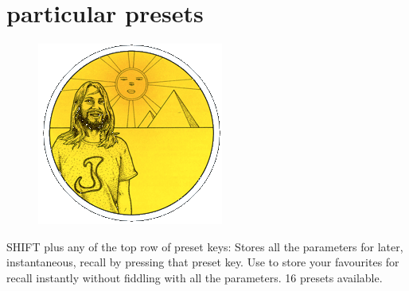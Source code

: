 \chapter{particular presets} 
\label{sec:presets}
\lstset{style=6502Style}
\lstset{ 
   aboveskip=5pt,
   belowskip=0pt,
}

\begin{definition}
\setlength{\intextsep}{0pt}%
\setlength{\columnsep}{3pt}%
\begin{figure}
\includegraphics[width=\linewidth]{src/callout/psych.png} 
\end{figure}
\small
SHIFT plus any of the top row of
preset keys: Stores all the parameters for later, instantaneous,
recall by pressing that preset key. Use to store your favourites for
recall instantly without fiddling with all the parameters. 16 presets
available.
\end{definition}

